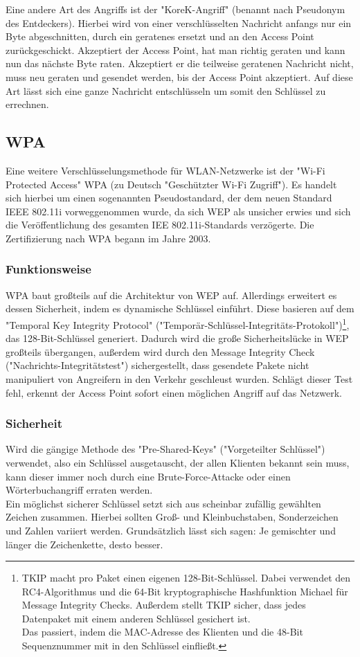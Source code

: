 \documentclass[a4paper,13pt]{scrartcl}
\begin{document}
Eine andere Art des Angriffs ist der "KoreK-Angriff" (benannt nach Pseudonym des Entdeckers). Hierbei wird von einer verschlüsselten Nachricht anfangs nur ein Byte abgeschnitten, durch ein geratenes ersetzt und an den Access Point zurückgeschickt. Akzeptiert der Access Point, hat man richtig geraten und kann nun das nächste Byte raten. Akzeptiert er die teilweise geratenen Nachricht nicht, muss neu geraten und gesendet werden, bis der Access Point akzeptiert. Auf diese Art lässt sich eine ganze Nachricht entschlüsseln um somit den Schlüssel zu errechnen.
\subsection{WPA}
Eine weitere Verschlüsselungsmethode für WLAN-Netzwerke ist der "Wi-Fi Protected Access" WPA (zu Deutsch "Geschützter Wi-Fi Zugriff"). Es handelt sich hierbei um einen sogenannten Pseudostandard, der dem neuen Standard IEEE 802.11i vorweggenommen wurde, da sich WEP als unsicher erwies und sich die Veröffentlichung des gesamten IEE 802.11i-Standards verzögerte. Die Zertifizierung nach WPA begann im Jahre 2003.
\subsubsection{Funktionsweise}
WPA baut großteils auf die Architektur von WEP auf. Allerdings erweitert es dessen Sicherheit, indem es dynamische Schlüssel einführt. Diese basieren auf dem "Temporal Key Integrity Protocol" ("Temporär-Schlüssel-Integritäts-Protokoll")\footnote{TKIP macht pro Paket einen eigenen 128-Bit-Schlüssel. Dabei verwendet den RC4-Algorithmus und die 64-Bit kryptographische Hashfunktion Michael für Message Integrity Checks. Außerdem stellt TKIP sicher, dass jedes Datenpaket mit einem anderen Schlüssel gesichert ist.\\
Das passiert, indem die MAC-Adresse des Klienten und die 48-Bit Sequenznummer mit in den Schlüssel einfließt.}, das 128-Bit-Schlüssel generiert. Dadurch wird die große Sicherheitslücke in WEP großteils übergangen, außerdem wird durch den Message Integrity Check ("Nachrichts-Integritätstest") sichergestellt, dass gesendete Pakete nicht manipuliert von Angreifern in den Verkehr geschleust wurden. Schlägt dieser Test fehl, erkennt der Access Point sofort einen möglichen Angriff auf das Netzwerk.
\subsubsection{Sicherheit}
Wird die gängige Methode des "Pre-Shared-Keys" ("Vorgeteilter Schlüssel") verwendet, also ein Schlüssel ausgetauscht, der allen Klienten bekannt sein muss, kann dieser immer noch durch eine Brute-Force-Attacke oder einen Wörterbuchangriff erraten werden.\\
Ein möglichst sicherer Schlüssel setzt sich aus scheinbar zufällig gewählten Zeichen zusammen. Hierbei sollten Groß- und Kleinbuchstaben, Sonderzeichen und Zahlen variiert werden. Grundsätzlich lässt sich sagen: Je gemischter und länger die Zeichenkette, desto besser.
\end{document}
